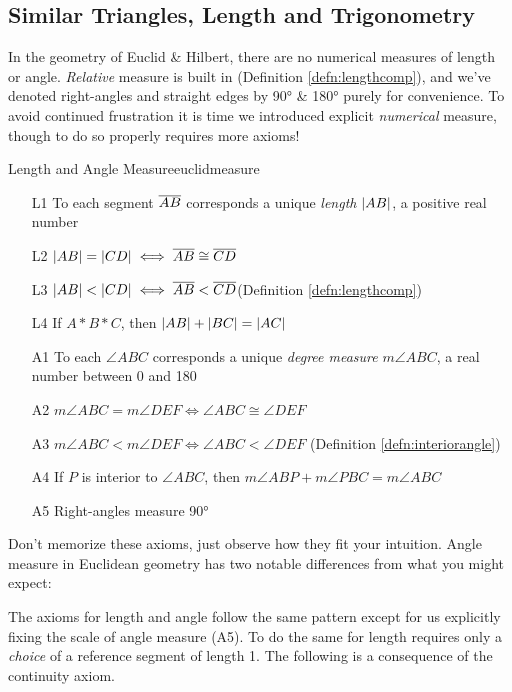 \clearpage


\subsection{Similar Triangles, Length and Trigonometry}\label{sec:similar}

In the geometry of Euclid \& Hilbert, there are no numerical measures of length or angle. \emph{Relative} measure is built in (Definition \ref{defn:lengthcomp}), and we've denoted right-angles and straight edges by \ang{90} \& \ang{180} purely for convenience. To avoid continued frustration it is time we introduced explicit \emph{numerical} measure, though to do so properly requires more axioms!

\begin{axioms}{Length and Angle Measure}{euclidmeasure}
	\begin{itemize}%
		\item[L1] To each segment $\overline{AB}$ corresponds a unique \emph{length} $\left| AB\right|$, a positive real number
		\item[L2] $\left| AB\right|=\left| CD\right|\iff \overline{AB}\cong\overline{CD}$
		\item[L3] $\left| AB\right|<\left| CD\right|\iff\overline{AB}<\overline{CD}$\hfill (Definition \ref{defn:lengthcomp})
		\item[L4] If $A*B*C$, then $\left| AB\right|+\left| BC\right|=\left| AC\right|$
		\item[A1] To each $\angle ABC$ corresponds a unique \emph{degree measure} $m\angle ABC$, a real number between 0 and 180
		\item[A2] $m\angle ABC=m\angle DEF\iff \angle ABC\cong\angle DEF$
		\item[A3] $m\angle ABC<m\angle DEF\iff \angle ABC<\angle DEF$ \hfill (Definition \ref{defn:interiorangle})
	  \item[A4] If $P$ is interior to $\angle ABC$, then $m\angle ABP+m\angle PBC=m\angle ABC$
	  \item[A5] Right-angles measure \ang{90}
	\end{itemize}
\end{axioms}

Don't memorize these axioms, just observe how they fit your intuition. Angle measure in Euclidean geometry has two notable differences from what you might expect:
The axioms for length and angle follow the same pattern except for us explicitly fixing the scale of angle measure (A5). To do the same for length requires only a \emph{choice} of a reference segment of length 1. The following is a consequence of the continuity axiom.

